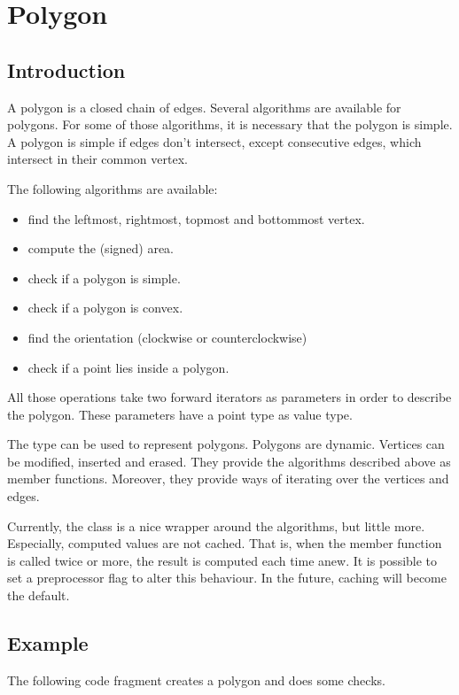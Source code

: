 
\cleardoublepage
\chapter{Polygon}\label{Polygon}

\section{Introduction}

A polygon is a closed chain of edges. Several algorithms are available for
polygons. For some of those algorithms, it is necessary that the polygon is
simple. A polygon is simple if edges don't intersect, except consecutive edges,
which intersect in their common vertex.

The following algorithms are available:
\begin{itemize}
\item find the leftmost, rightmost, topmost and bottommost vertex.
\item compute the (signed) area.
\item check if a polygon is simple.
\item check if a polygon is convex.
\item find the orientation (clockwise or counterclockwise)
\item check if a point lies inside a polygon.
\end{itemize}
All those operations take two forward iterators as parameters in order to
describe the polygon. These parameters have a point type as value type.

The type  can be used to represent polygons.
Polygons are dynamic. Vertices can be modified, inserted and erased.
They provide the algorithms described above as member functions.
Moreover, they provide ways of iterating over the vertices and edges.

Currently, the  class is a nice wrapper around the algorithms,
but little more. Especially, computed values are not cached.
That is, when the  member function is called twice or more,
the result is computed each time anew. It is possible to set a preprocessor flag
to alter this behaviour. In the future, caching will become the default.

\section{Example}

The following code fragment creates a polygon and does some checks.

